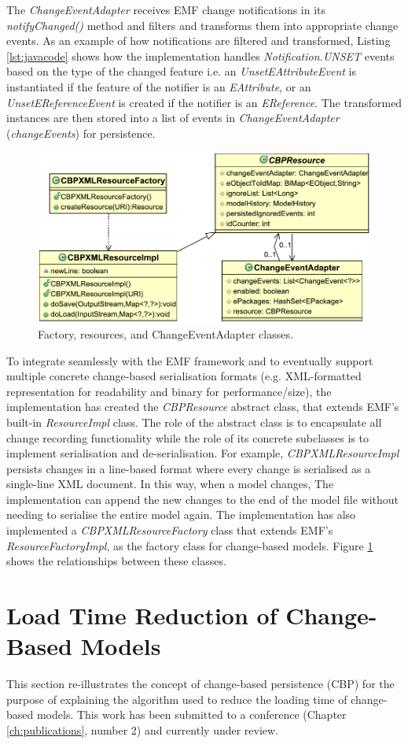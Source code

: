 \documentclass[12pt, a4paper]{report} \usepackage[titletoc]{appendix}
\begin{document}
The \emph{ChangeEventAdapter} receives EMF change notifications in its \emph{notifyChanged()} method and filters and transforms them into appropriate change events. As an example of how notifications are filtered and transformed, Listing \ref{lst:javacode} shows how the implementation handles \emph{Notification.UNSET} events based on the type of the changed feature i.e. an \emph{UnsetEAttributeEvent} is instantiated if the feature of the notifier is an \emph{EAttribute}, or an \emph{UnsetEReferenceEvent} is created if the notifier is an \emph{EReference}. The transformed instances are then stored into a list of events in \emph{ChangeEventAdapter} (\emph{changeEvents}) for persistence. 

\begin{figure}[th]
	\centering
	\includegraphics[width=0.6\linewidth]{resources}
	\caption{Factory, resources, and ChangeEventAdapter classes.}
	\label{fig:resources}
\end{figure}

To integrate seamlessly with the EMF framework and to eventually support multiple concrete change-based serialisation formats (e.g. XML-formatted representation for readability and binary for performance/size), the implementation has created the \emph{CBPResource} abstract class, that extends EMF's built-in \emph{ResourceImpl} class. The role of the abstract class is to encapsulate all change recording functionality while the role of its concrete subclasses is to implement serialisation and de-serialisation. For example, \emph{CBPXMLResourceImpl} persists changes in a line-based format where every change is serialised as a single-line XML document. In this way, when a model changes, The implementation can append the new changes to the end of the model file without needing to serialise the entire model again. The implementation has also implemented a \emph{CBPXMLResourceFactory} class that extends EMF's \emph{ResourceFactoryImpl}, as the factory class for change-based models. Figure \ref{fig:resources} shows the relationships between these classes.

\section{Load Time Reduction of Change-Based Models}
\label{sec:load_time_reduction_of_change-based_models}
This section re-illustrates the concept of change-based persistence (CBP) for the purpose of explaining the algorithm used to reduce the loading time of change-based models. This work has been submitted to a conference (Chapter \ref{ch:publications}, number 2) and currently under review. 
\end{document}
